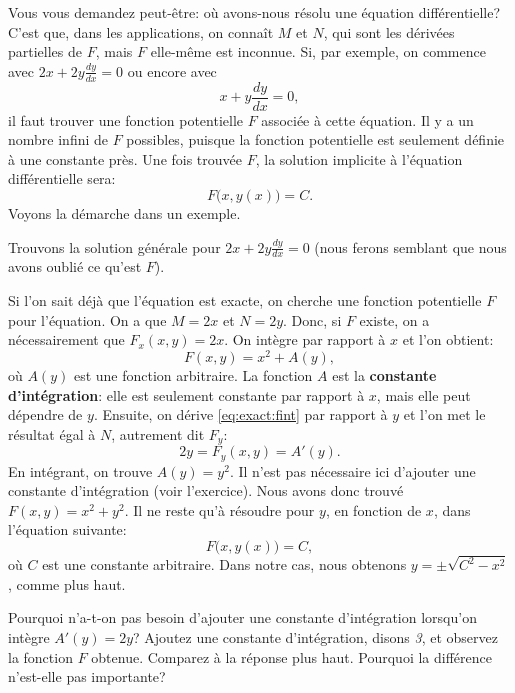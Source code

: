 Vous vous demandez peut-être: où avons-nous résolu une équation différentielle?
C'est que, dans les applications, on connaît $M$ et $N$, qui sont les dérivées partielles de $F$, mais $F$ elle-même est inconnue.
Si, par exemple, on commence avec $2x + 2y \frac{dy}{dx} = 0$ ou encore avec
\begin{equation*}
	x + y \frac{dy}{dx} = 0,
\end{equation*}
il faut trouver une fonction potentielle $F$ associée à cette équation.
Il y a un nombre infini de $F$ possibles, puisque la fonction potentielle est seulement définie à une constante près.
Une fois trouvée $F$, la solution implicite à l'équation différentielle sera:
\begin{equation*}
	F\bigl(x,y(x)\bigr) = C.
\end{equation*}
Voyons la démarche dans un exemple.
\begin{example}
	Trouvons la solution générale pour 	$2x + 2y \frac{dy}{dx} = 0$ 
	(nous ferons semblant que nous avons oublié ce qu'est $F$).

	Si l'on sait déjà que l'équation est exacte, on cherche une fonction potentielle $F$ pour l'équation.
	On a que $M = 2x$ et $N=2y$.
	Donc, si $F$ existe, on a nécessairement que $F_x (x,y) = 2x$.
	On intègre par rapport à $x$ et l'on obtient:
	\begin{equation} \label{eq:exact:fint}
		F(x,y) = x^2 + A(y),
	\end{equation}
	où $A(y)$ est une fonction arbitraire.  
	La fonction $A$ est la {\bf constante d'intégration}:
	elle est seulement constante par rapport à $x$, mais elle peut dépendre de $y$.
	Ensuite, on dérive \eqref{eq:exact:fint} par rapport à $y$ et l'on met le résultat égal à $N$, autrement dit $F_y$:
	\begin{equation*}
		2y = F_y (x,y) = A'(y) .
	\end{equation*}
	En intégrant, on trouve $A(y) = y^2$.  Il n'est pas nécessaire ici d'ajouter une constante d'intégration	(voir l'exercice).    
	Nous avons donc trouvé $F(x,y) = x^2+y^2$.
	Il ne reste qu'à résoudre pour $y$, en fonction de $x$, dans l'équation suivante:
	\begin{equation*}
		F\bigl(x,y(x)\bigr) = C, 
	\end{equation*}
	où $C$ est une constante arbitraire. Dans notre cas, nous obtenons $y = \pm \sqrt{C^2-x^2}$, comme plus haut.
\end{example}

\begin{exercise}\label{exer:exact}
	Pourquoi n'a-t-on pas besoin d'ajouter une constante d'intégration lorsqu'on intègre $A'(y) = 2y$?
	Ajoutez une constante d'intégration, disons \textit{3}, et observez la fonction $F$ obtenue.
	Comparez à la réponse plus haut.  Pourquoi la différence n'est-elle pas importante?
\end{exercise}

